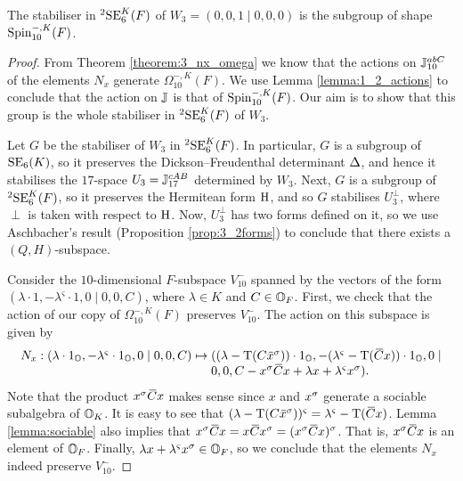 \begin{theorem}
	The stabiliser in ${}^2\mathrm{SE}_6^K(F)$ of $W_3 = (0,0,1\mid 0,0,0)$ 
	is the subgroup of shape $\mathrm{Spin}_{10}^{-,K}(F)$. 
\end{theorem}

\begin{proof}
	From Theorem \ref{theorem:3_nx_omega} we know that the actions on $\mathbb{J}_{10}^{abC}$
	of the elements $N_x$ generate $\Omega_{10}^{-,K}(F)$. We use 
	Lemma \ref{lemma:1_2_actions} to conclude that the action on $\mathbb{J}$ is that of
	$\mathrm{Spin}_{10}^{-,K}(F)$. Our aim is to show that this group is the whole stabiliser
	in ${}^2\mathrm{SE}_6^K(F)$ of $W_3$.
	
	Let $G$ be the stabiliser of $W_3$ in ${}^2\mathrm{SE}_6^K(F)$. In particular, $G$ is 
	a subgroup of $\mathrm{SE}_6(K)$, so it preserves the Dickson--Freudenthal determinant
	$\Delta$, and hence it stabilises the $17$-space $U_3 = \mathbb{J}_{17}^{cAB}$ 
	determined by $W_3$. Next, $G$
	is a subgroup of ${}^2\mathrm{SE}_6^K(F)$, so it preserves the Hermitean form $\mathrm{H}$,
	and so $G$ stabilises $U_3^{\perp}$, where $\perp$ is taken with respect to $\mathrm{H}$. 
	Now, $U_3^{\perp}$ has two forms defined on it, so we use Aschbacher's result 
	(Proposition \ref{prop:3_2forms}) to conclude that there exists a $(Q, H)$-subspace.	
	
	Consider the $10$-dimensional $F$-subspace $V_{10}^-$ spanned by the vectors 
	of the form $(\lambda\cdot 1, -\lambda^{\varsigma}\cdot 1, 
	0 \mid 0,0,C)$, where $\lambda \in K$ and 
	$C \in \mathbb{O}_F$. First, we check that the action of our copy of $\Omega_{10}^{-,K}(F)$ 
	preserves $V_{10}^-$. The action on this subspace is given by
	\begin{equation*}
		\begin{array}{r@{\;}c@{\;}l}
			N_x: (\lambda\cdot 1_{\O}, -\lambda^{\varsigma} \cdot 1_{\O}, 0 \mid 0,0, C) & \mapsto & 
				((\lambda - \Tr(C \ovx^{\s}))\cdot 1_{\O}, 
				-(\lambda^{\varsigma} -\Tr(\ovC x))\cdot 1_{\O}, 
				0 \mid \\
		& &					0,0, C - x^{\s} \ovC x + \lambda x + \lambda^{\varsigma} x^{\s}).
		\end{array}
	\end{equation*}
	Note that the product $x^{\sigma} \mathord{\mbox{\hspace*{0pt}}\,\overline{\!C\!\!\;}\!\:}\mbox{\hspace*{0pt}} x$ makes sense since $x$ and $x^{\sigma}$ generate a
	sociable subalgebra of $\mathbb{O}_K$. It is easy to see that 
	$(\lambda - \Tr(C\ovx^{\s}))^{\varsigma} = 
	\lambda^{\varsigma} - \Tr(\ovC x)$. Lemma \ref{lemma:sociable} also implies that 
	$x^{\s} \ovC x = x \ovC x^{\s} = (x^{\s} \ovC x)^{\s}$. That is, $x^{\sigma} \mathord{\mbox{\hspace*{0pt}}\,\overline{\!C\!\!\;}\!\:}\mbox{\hspace*{0pt}} x$ is an 
    element of $\mathbb{O}_F$. Finally, $\lambda x +  \lambda^{\varsigma} x^{\sigma} \in \mathbb{O}_F$, 
    so we conclude that 
    the elements $N_x$ indeed preserve $V_{10}^{-}$.
    

\end{proof}
